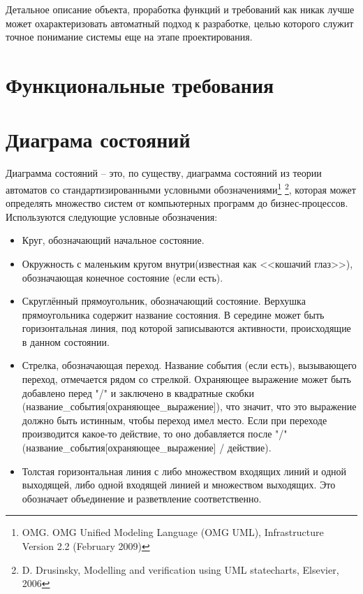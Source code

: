 \documentclass[12pt, twoside]{report}
\begin{document}
Детальное описание объекта, проработка функций и требований как никак лучше может охарактеризовать автоматный подход к разработке, целью которого служит точное понимание системы еще на этапе проектирования.

\section*{Функциональные требования}



\section*{Диаграма состояний}

Диаграмма состояний -- это, по существу, диаграмма состояний из теории автоматов со стандартизированными условными обозначениями\footnote{OMG. OMG Unified Modeling Language (OMG UML), Infrastructure Version 2.2 (February 2009)} \footnote{D. Drusinsky, Modelling and verification using UML statecharts, Elsevier, 2006}, которая может определять множество систем от компьютерных программ до бизнес-процессов. Используются следующие условные обозначения:
\begin{itemize}
  \item Круг, обозначающий начальное состояние.
  \item Окружность с маленьким кругом внутри(известная как <<кошачий глаз>>), обозначающая конечное состояние (если есть).
  \item Скруглённый прямоугольник, обозначающий состояние. Верхушка прямоугольника содержит название состояния. В середине может быть горизонтальная линия, под которой записываются активности, происходящие в данном состоянии.
  \item Стрелка, обозначающая переход. Название события (если есть), вызывающего переход, отмечается рядом со стрелкой. Охраняющее выражение может быть добавлено перед "/" и заключено в квадратные скобки (название\_события[охраняющее\_выражение]), что значит, что это выражение должно быть истинным, чтобы переход имел место. Если при переходе производится какое-то действие, то оно добавляется после "/" (название\_события[охраняющее\_выражение] / действие).
  \item Толстая горизонтальная линия с либо множеством входящих линий и одной выходящей, либо одной входящей линией и множеством выходящих. Это обозначает объединение и разветвление соответственно.
\end{itemize}
\end{document}
